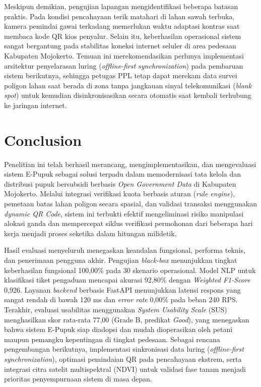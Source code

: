 \documentclass[conference]{IEEEtran}
\begin{document}
Meskipun demikian, pengujian lapangan mengidentifikasi beberapa batasan praktis. Pada kondisi pencahayaan terik matahari di lahan sawah terbuka, kamera pemindai gawai terkadang memerlukan waktu adaptasi kontras saat membaca kode QR kios penyalur. Selain itu, keberhasilan operasional sistem sangat bergantung pada stabilitas koneksi internet seluler di area pedesaan Kabupaten Mojokerto. Temuan ini merekomendasikan perlunya implementasi arsitektur penyelarasan luring (\textit{offline-first synchronization}) pada pembaruan sistem berikutnya, sehingga petugas PPL tetap dapat merekam data survei poligon lahan saat berada di zona tanpa jangkauan sinyal telekomunikasi (\textit{blank spot}) untuk kemudian disinkronisasikan secara otomatis saat kembali terhubung ke jaringan internet.

\section{Conclusion}
Penelitian ini telah berhasil merancang, mengimplementasikan, dan mengevaluasi sistem E-Pupuk sebagai solusi terpadu dalam memodernisasi tata kelola dan distribusi pupuk bersubsidi berbasis \textit{Open Government Data} di Kabupaten Mojokerto. Melalui integrasi verifikasi kuota berbasis aturan (\textit{rule engine}), pemetaan batas lahan poligon secara spasial, dan validasi transaksi menggunakan \textit{dynamic QR Code}, sistem ini terbukti efektif mengeliminasi risiko manipulasi alokasi ganda dan mempercepat siklus verifikasi permohonan dari beberapa hari kerja menjadi proses seketika dalam hitungan milidetik.

Hasil evaluasi menyeluruh menegaskan keandalan fungsional, performa teknis, dan penerimaan pengguna akhir. Pengujian \textit{black-box} menunjukkan tingkat keberhasilan fungsional 100,00\% pada 30 skenario operasional. Model NLP untuk klasifikasi tiket pengaduan mencapai akurasi 92,80\% dengan \textit{Weighted F1-Score} 0,926. Layanan \textit{backend} berbasis FastAPI menunjukkan latensi respons yang sangat rendah di bawah 120 ms dan \textit{error rate} 0,00\% pada beban 240 RPS. Terakhir, evaluasi usabilitas menggunakan \textit{System Usability Scale} (SUS) menghasilkan skor rata-rata 77,00 (Grade B, predikat \textit{Good}), yang menegaskan bahwa sistem E-Pupuk siap diadopsi dan mudah dioperasikan oleh petani maupun pemangku kepentingan di tingkat pedesaan. Sebagai rencana pengembangan berikutnya, implementasi sinkronisasi data luring (\textit{offline-first synchronization}), optimasi pemindaian QR pada pencahayaan ekstrem, serta integrasi citra satelit multispektral (NDVI) untuk validasi fase tanam menjadi prioritas penyempurnaan sistem di masa depan.
\end{document}
